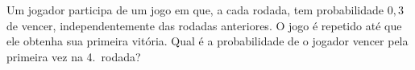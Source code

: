 %
%


\begin{exercicioBanco}[\valorquestao]
Um jogador participa de um jogo em que, a cada rodada, tem probabilidade \(0{,}3\) de vencer, independentemente das rodadas anteriores. O jogo é repetido até que ele obtenha sua primeira vitória. Qual é a probabilidade de o jogador vencer pela primeira vez na 4.\textordfeminine\ rodada?
%
\end{exercicioBanco}


